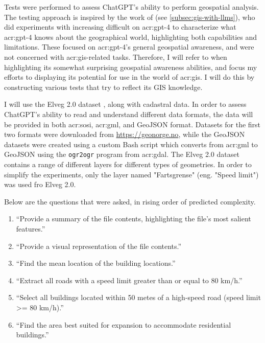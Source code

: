Tests were performed to assess ChatGPT's ability to perform geospatial analysis. The testing approach is inspired by the work of \cite{robertsGPT4GEOHowLanguage2023} (see \autoref{subsec:gis-with-llms}), who did experiments with increasing difficult on \acrshort{acr:gpt}-4 to characterize what \acrshort{acr:gpt}-4 knows about the geographical world, highlighting both capabilities and limitations. These focused on \acrshort{acr:gpt}-4's general geospatial awareness, and were not concerned with \acrshort{acr:gis}-related tasks. Therefore, I will refer to \cite{robertsGPT4GEOHowLanguage2023} when highlighting its somewhat surprising geospatial awareness abilities, and focus my efforts to displaying its potential for use in the world of \acrshort{acr:gis}. I will do this by constructing various tests that try to reflect its GIS knowledge.

I will use the Elveg 2.0 dataset \citep{thenorwegianmappingauthorityElveg2019}, along with cadastral data. In order to assess ChatGPT's ability to read and understand different data formats, the data will be provided in both \acrshort{acr:sosi}, \acrshort{acr:gml}, and GeoJSON format. Datasets for the first two formats were downloaded from \url{https://geonorge.no}, while the GeoJSON datasets were created using a custom Bash script which converts from \acrshort{acr:gml} to GeoJSON using the \texttt{ogr2ogr} program from \acrshort{acr:gdal}. The Elveg 2.0 dataset contains a range of different layers for different types of geometries. In order to simplify the experiments, only the layer named "Fartsgrense" (eng. "Speed limit") was used fro Elveg 2.0.

Below are the questions that were asked, in rising order of predicted complexity.

\begin{enumerate}
    \item \enquote{Provide a summary of the file contents, highlighting the file's most salient features.}
    \item \enquote{Provide a visual representation of the file contents.}
    \item \enquote{Find the mean location of the building locations.}
    \item \enquote{Extract all roads with a speed limit greater than or equal to 80 km/h.}
    \item \enquote{Select all buildings located within 50 metes of a high-speed road (speed limit >= 80 km/h).}
    \item \enquote{Find the area best suited for expansion to accommodate residential buildings.}
\end{enumerate}
\label{enum:gpt-gis-questions}

